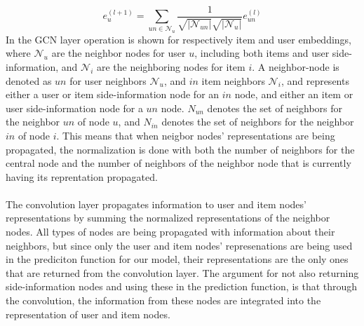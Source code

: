 \begin{equation}\label{eq:csgcn_is_gc_layer_user}
     e_{u}^{(l+1)}=\sum_{un\in \mathcal{N}_{u}}\frac{1}{\sqrt{|\mathcal{N}_{un}|} \sqrt{|\mathcal{N}_{u}|}}e_{un}^{(l)}
\end{equation}
In  the GCN layer operation is shown for respectively item and user embeddings, where $\mathcal{N}_{u}$ are the neighbor nodes for user $u$, including both items and user side-information, and $\mathcal{N}_{i}$ are the neighboring nodes for item $i$. 
A neighbor-node is denoted as $un$ for user neighbors $\mathcal{N}_{u}$, and $in$ item neighbors $\mathcal{N}_{i}$, and represents either a user or item side-information node for an $in$ node, and either an item or user side-information node for a $un$ node.
$N_{un}$ denotes the set of neighbors for the neighbor $un$ of node $u$, and $N_{in}$ denotes the set of neighbors for the neighbor $in$ of node $i$.
This means that when neigbor nodes' representations are being propagated, the normalization is done with both the number of neighbors for the central node and the number of neighbors of the neighbor node that is currently having its reprentation propagated.
\\\\
The convolution layer propagates information to user and item nodes' representations by summing the normalized representations of the neighbor nodes.
All types of nodes are being propagated with information about their neighbors, but since only the user and item nodes' represenations are being used in the prediciton function for our model, their representations are the only ones that are returned from the convolution layer.
The argument for not also returning side-information nodes and using these in the prediction function, is that through the convolution, the information from these nodes are integrated into the representation of user and item nodes.

